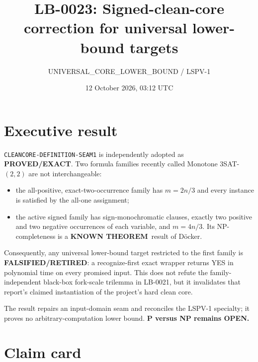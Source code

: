 \documentclass[11pt]{article}
\title{LB-0023: Signed-clean-core correction for universal lower-bound targets}
\author{UNIVERSAL\_CORE\_LOWER\_BOUND / LSPV-1}
\date{12 October 2026, 03:12 UTC}
\newcommand{\EXACT}{\textbf{PROVED/EXACT}}
\newcommand{\KNOWN}{\textbf{KNOWN THEOREM}}
\newcommand{\RETIRED}{\textbf{FALSIFIED/RETIRED}}
\begin{document}
\maketitle

\section*{Executive result}

\texttt{CLEANCORE-DEFINITION-SEAM1} is independently adopted as \EXACT.  Two formula families recently called Monotone
$3$SAT-$(2,2)$ are not interchangeable:
\begin{itemize}
\item the all-positive, exact-two-occurrence family has
$m=2n/3$ and every instance is satisfied by the all-one assignment;
\item the active signed family has sign-monochromatic clauses, exactly two
positive and two negative occurrences of each variable, and $m=4n/3$.
Its NP-completeness is a \KNOWN\ result of D\"ocker.
\end{itemize}
Consequently, any universal lower-bound target restricted to the first
family is \RETIRED: a recognize-first exact wrapper returns YES in
polynomial time on every promised input.  This does not refute the
family-independent black-box fork-scale trilemma in LB-0021, but it
invalidates that report's claimed instantiation of the project's hard clean
core.

The result repairs an input-domain seam and reconciles the LSPV-1 specialty; it proves no arbitrary-computation lower bound.
\textbf{P versus NP remains OPEN.}

\section{Claim card}
\end{document}
